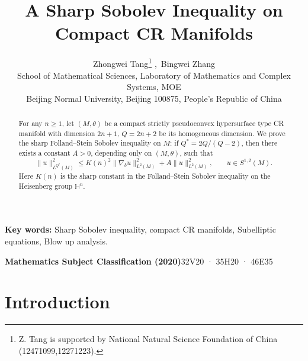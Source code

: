 \documentclass[11pt]{article}
\numberwithin{equation}{section}
\numberwithin{equation}{section}
\begin{document}
	
	
	\title{\bf A Sharp Sobolev Inequality on Compact CR Manifolds}
	
	\author{ \sc Zhongwei Tang\thanks{Z. Tang is supported by National Natural Science Foundation of China (12471099,12271223).} ,\, Bingwei Zhang\\
		{\small School of Mathematical Sciences, Laboratory of Mathematics and Complex Systems, MOE\\
			\small	Beijing Normal University, Beijing 100875, People’s Republic of China	}
	}
	
	\date{}
	
	\maketitle
	
	\begin{abstract}
	For any $n\geq 1$, let \((M,\theta)\) be a compact strictly pseudoconvex  hypersurface type CR manifold with dimension  $2n+1$,  \(Q=2n+2\) be its homogeneous dimension. We prove the sharp Folland--Stein Sobolev inequality on \(M\): if \(Q^*=2Q/(Q-2)\), then there exists a constant \(A>0\), depending only on \((M,\theta)\), such that
		\[
		\|u\|_{L^{Q^*}(M)}^2 \le K(n)^2\|\nabla_b u\|_{L^2(M)}^2 + A\|u\|_{L^2(M)}^2, \qquad u\in S^{1,2}(M).
		\]
		Here \(K(n)\) is the sharp constant in the Folland--Stein Sobolev inequality on the Heisenberg group \(\mathbb H^n\).
	\end{abstract}
	
	{\noindent \small \bf Key words:} Sharp Sobolev inequality, compact CR manifolds,  Subelliptic equations,  Blow up analysis.
	
	{\noindent \small \bf Mathematics Subject Classification (2020)}\quad 32V20 · 35H20 ·  46E35
	\section{Introduction}
	
\end{document}
